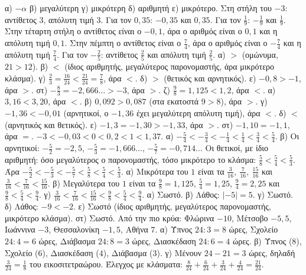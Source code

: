  α) $-\alpha$ \quad β) μεγαλύτερη \quad γ) μικρότερη \quad δ) αριθμητή \quad ε) μικρότερο.
 Στη στήλη του $-3$: αντίθετος $3$, απόλυτη τιμή $3$. Για τον $0{,}35$: $-0{,}35$ και $0{,}35$. Για τον $\frac{1}{9}$: $-\frac{1}{9}$ και $\frac{1}{9}$. Στην τέταρτη στήλη ο αντίθετος είναι ο $-0{,}1$, άρα ο αριθμός είναι ο $0{,}1$ και η απόλυτη τιμή $0{,}1$. Στην πέμπτη ο αντίθετος είναι ο $\frac{7}{4}$, άρα ο αριθμός είναι ο $-\frac{7}{4}$ και η απόλυτη τιμή $\frac{7}{4}$. Για τον $-\frac{2}{5}$: αντίθετος $\frac{2}{5}$ και απόλυτη τιμή $\frac{2}{5}$.
 α) $>$ (ομώνυμα, $21>12$). β) $<$ (ίδιος αριθμητής, μεγαλύτερος παρονομαστής, άρα μικρότερο κλάσμα). γ) $\frac{2}{3}=\frac{16}{24}<\frac{21}{24}=\frac{7}{8}$, άρα $<$. δ) $>$ (θετικός και αρνητικός). ε) $-0{,}8>-1$, άρα $>$. στ) $-\frac{8}{3}=-2{,}666\ldots>-3$, άρα $>$. ζ) $\frac{9}{8}=1{,}125<1{,}2$, άρα $<$.
 α) $3{,}16<3{,}20$, άρα $<$. β) $0{,}092>0{,}087$ (στα εκατοστά $9>8$), άρα $>$. γ) $-1{,}36<-0{,}01$ (αρνητικοί, ο $-1{,}36$ έχει μεγαλύτερη απόλυτη τιμή), άρα $<$. δ) $<$ (αρνητικός και θετικός). ε) $-1{,}3=-1{,}30>-1{,}33$, άρα $>$. στ) $-1{,}10=-1{,}1$, άρα $=$.
 $-3<-0{,}03<0<0{,}2<1<1{,}37$.
 α) $-\frac{5}{4}<-\frac{3}{4}<-\frac{1}{4}<\frac{1}{4}<\frac{3}{4}<\frac{5}{4}$. β) Οι αρνητικοί: $-\frac{5}{2}=-2{,}5$, $-\frac{5}{3}=-1{,}666\ldots$, $-\frac{5}{7}=-0{,}714\ldots$ Οι θετικοί, με ίδιο αριθμητή: όσο μεγαλύτερος ο παρονομαστής, τόσο μικρότερο το κλάσμα: $\frac{5}{8}<\frac{5}{4}<\frac{5}{3}$. Άρα $-\frac{5}{2}<-\frac{5}{3}<-\frac{5}{7}<\frac{5}{8}<\frac{5}{4}<\frac{5}{3}$.
 α) Μικρότερα του $1$ είναι τα $\frac{3}{16},\ \frac{7}{16},\ \frac{15}{16}$ και $\frac{3}{16}<\frac{7}{16}<\frac{15}{16}$. β) Μεγαλύτερα του $1$ είναι τα $\frac{9}{8}=1{,}125$, $\frac{5}{4}=1{,}25$, $\frac{9}{4}=2{,}25$ και $\frac{9}{8}<\frac{5}{4}<\frac{9}{4}$. γ) $\frac{3}{16}<\frac{7}{16}<\frac{15}{16}<\frac{9}{8}<\frac{5}{4}<\frac{9}{4}$.
 α) Σωστό. β) Λάθος: $|-5|=5$. γ) Σωστό. δ) Λάθος: $-9<-2$. ε) Σωστό (ίδιος αριθμητής, μεγαλύτερος παρονομαστής, μικρότερο κλάσμα). στ) Σωστό.
 Από την πιο κρύα: Φλώρινα $-10$, Μέτσοβο $-5{,}5$, Ιωάννινα $-3$, Θεσσαλονίκη $-1{,}5$, Αθήνα $7$.
 α) Ύπνος $24:3=8$ ώρες, Σχολείο $24:4=6$ ώρες, Διάβασμα $24:8=3$ ώρες, Διασκέδαση $24:6=4$ ώρες. β) Ύπνος ($8$), Σχολείο ($6$), Διασκέδαση ($4$), Διάβασμα ($3$). γ) Μένουν $24-21=3$ ώρες, δηλαδή $\frac{3}{24}=\frac{1}{8}$ του εικοσιτετραώρου. Έλεγχος με κλάσματα: $\frac{8}{24}+\frac{6}{24}+\frac{3}{24}+\frac{4}{24}=\frac{21}{24}$.
